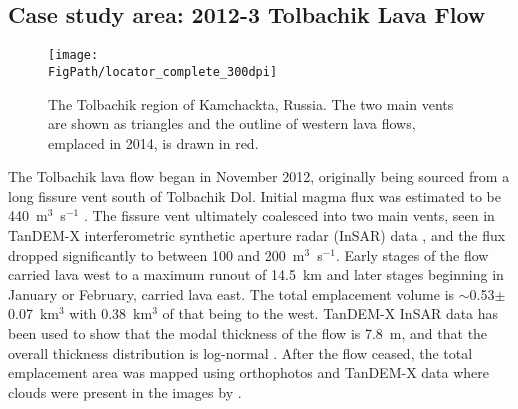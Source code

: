 	
	\subsection{Case study area: 2012-3 Tolbachik Lava Flow}\label{sec_tolb_back}
	
\begin{figure}[!h]
	\centering
	\texttt{[image: \\FigPath/locator\_complete\_300dpi]}
	\caption[The Tolbachik region of Kamchackta, Russia]{The Tolbachik region of Kamchackta, Russia. The two main vents are shown as triangles and the outline of western lava flows, emplaced in 2014, is drawn in red.}
	\label{fig_locator}
\end{figure}
	
The Tolbachik lava flow began in November 2012, originally being sourced from a long fissure vent south of Tolbachik Dol. Initial magma flux was estimated to be 440~m$^3$~s$^{-1}$ \citep{belousov2015overview}. The fissure vent ultimately coalesced into two main vents, seen in TanDEM-X interferometric synthetic aperture radar (InSAR) data \citep{kubanek2015lava}, and the flux dropped significantly to between 100 and 200~m$^3$~s$^{-1}$. Early stages of the flow carried lava west to a maximum runout of 14.5~km and later stages beginning in January or February, carried lava east. The total emplacement volume is $\sim$0.53$\pm$0.07~km$^3$ with 0.38~km$^3$ of that being to the west. TanDEM-X InSAR data has been used to show that the modal thickness of the flow is 7.8~m, and that the overall thickness distribution is log-normal \citep{kubanek2015lava}. After the flow ceased, the total emplacement area was mapped using orthophotos and TanDEM-X data where clouds were present in the images by \citet{kubanek2015lava}.

